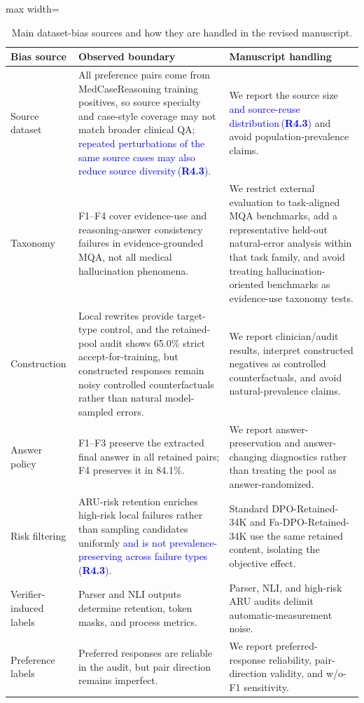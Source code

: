 \documentclass[a4paper,fleqn,doubleblind]{cas-sc}
\DeclareRobustCommand{\added}[1]{\textcolor{blue}{#1}}
\DeclareRobustCommand{\revtag}[1]{\textcolor{blue}{\scriptsize\,(\textbf{#1})}}
\begin{document}
\begin{table}[htbp]
    \centering
    \begingroup\color{blue}
    \footnotesize
    \caption{Main dataset-bias sources and how they are handled in the revised manuscript.}
    \label{tab:dataset_bias_sources}
    \begin{adjustbox}{max width=\textwidth}
    \begin{tabular}{p{}p{}p{}}
        \toprule
        \textbf{Bias source} & \textbf{Observed boundary} & \textbf{Manuscript handling} \\
        \midrule
        Source dataset & All preference pairs come from MedCaseReasoning training positives, so source specialty and case-style coverage may not match broader clinical QA; \added{repeated perturbations of the same source cases may also reduce source diversity}\revtag{R4.3}. & We report the source size \added{and source-reuse distribution}\revtag{R4.3} and avoid population-prevalence claims. \\
        Taxonomy & F1--F4 cover evidence-use and reasoning-answer consistency failures in evidence-grounded MQA, not all medical hallucination phenomena. & We restrict external evaluation to task-aligned MQA benchmarks, add a representative held-out natural-error analysis within that task family, and avoid treating hallucination-oriented benchmarks as evidence-use taxonomy tests. \\
        Construction & Local rewrites provide target-type control, and the retained-pool audit shows 65.0\% strict accept-for-training, but constructed responses remain noisy controlled counterfactuals rather than natural model-sampled errors. & We report clinician/audit results, interpret constructed negatives as controlled counterfactuals, and avoid natural-prevalence claims. \\
        Answer policy & F1--F3 preserve the extracted final answer in all retained pairs; F4 preserves it in 84.1\%. & We report answer-preservation and answer-changing diagnostics rather than treating the pool as answer-randomized. \\
        Risk filtering & ARU-risk retention enriches high-risk local failures rather than sampling candidates uniformly \added{and is not prevalence-preserving across failure types}\revtag{R4.3}. & Standard DPO-Retained-34K and Fa-DPO-Retained-34K use the same retained content, isolating the objective effect. \\
        Verifier-induced labels & Parser and NLI outputs determine retention, token masks, and process metrics. & Parser, NLI, and high-risk ARU audits delimit automatic-measurement noise. \\
        Preference labels & Preferred responses are reliable in the audit, but pair direction remains imperfect. & We report preferred-response reliability, pair-direction validity, and w/o-F1 sensitivity. \\
        \bottomrule
    \end{tabular}
    \end{adjustbox}
    \endgroup
\end{table}
\end{document}
